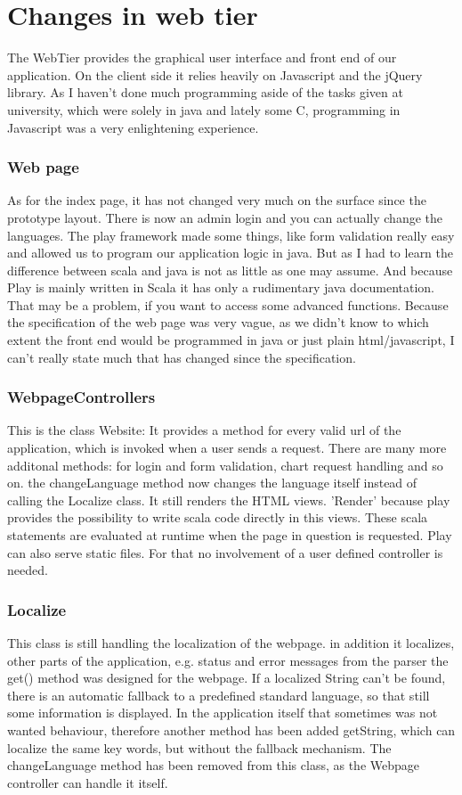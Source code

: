 \section{Changes in web tier}

The WebTier provides the graphical user interface and front end of our application.
On the client side it relies heavily on Javascript and the jQuery library.
As I haven't done much programming aside of the tasks given at university, which were solely in java and lately some C,
programming in Javascript was a very enlightening experience.

\subsubsection{Web page}
As for the index page, it has not changed very much on the surface since the prototype layout.
There is now an admin login and you can actually change the languages.
The play framework made some things, like form validation really easy and allowed us to program our application logic in java.
But as I had to learn the difference between scala and java is not as little as one may assume.
And because Play is mainly written in Scala it has only a rudimentary java documentation. That may be a problem, if you want
to access some advanced functions.
Because the specification of the web page was very vague, as we didn't know to which extent the front end would be
programmed in java or just plain html/javascript, I can't really state much that has changed since the specification.

\subsubsection{WebpageControllers}
This is the class Website: It provides a method for every valid url of the application, which is invoked when a user sends
a request.
There are many more additonal methods:
for login and form validation, chart request handling and so on.
the changeLanguage method now changes the language itself instead of calling the Localize class.
It still renders the HTML views. 'Render' because play provides the possibility to write scala code directly in this views.
These scala statements are evaluated at runtime when the page in question is requested.
Play can also serve static files. For that no involvement of a user defined controller is needed.

\subsubsection{Localize}
This class is still handling the localization of the webpage. in addition it localizes, other parts of the application,
e.g. status and error messages from the parser
the get() method was designed for the webpage. If a localized String can't be found, there is an automatic fallback to a
predefined standard language, so that still some information is displayed.
In the application itself that sometimes was not wanted behaviour, therefore another method has been added
getString, which can localize the same key words, but without the fallback mechanism.
The changeLanguage method has been removed from this class, as the Webpage controller can handle it itself.

